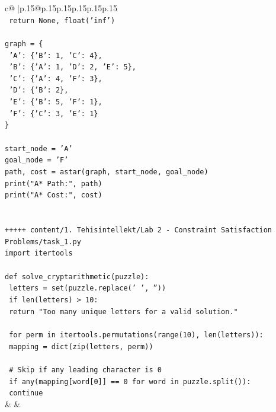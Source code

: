 \documentclass{article}
\begin{document}
{\begin{supertabular}{c@{$\;$}|p{.15\linewidth}@{}p{.15\linewidth}p{.15\linewidth}p{.15\linewidth}p{.15\linewidth}p{.15\linewidth}}
{{{\\ 
\texttt{    return None, float('inf')} \\
\\ 
\texttt{graph = \{} \\
\texttt{    'A': \{'B': 1, 'C': 4\},} \\
\texttt{    'B': \{'A': 1, 'D': 2, 'E': 5\},} \\
\texttt{    'C': \{'A': 4, 'F': 3\},} \\
\texttt{    'D': \{'B': 2\},} \\
\texttt{    'E': \{'B': 5, 'F': 1\},} \\
\texttt{    'F': \{'C': 3, 'E': 1\}} \\
\texttt{\}} \\
\\ 
\texttt{start\_node = 'A'} \\
\texttt{goal\_node = 'F'} \\
\texttt{path, cost = astar(graph, start\_node, goal\_node)} \\
\texttt{print("A* Path:", path)} \\
\texttt{print("A* Cost:", cost)} \\
\\ 
\\ 
\texttt{+++++ content/1. Tehisintellekt/Lab 2 {-} Constraint Satisfaction Problems/task\_1.py} \\
\texttt{import itertools} \\
\\ 
\texttt{def solve\_cryptarithmetic(puzzle):} \\
\texttt{    letters = set(puzzle.replace(' ', ''))} \\
\texttt{    if len(letters) > 10:} \\
\texttt{        return "Too many unique letters for a valid solution."} \\
\\ 
\texttt{    for perm in itertools.permutations(range(10), len(letters)):} \\
\texttt{        mapping = dict(zip(letters, perm))} \\
\\ 
\texttt{        \# Skip if any leading character is 0} \\
\texttt{        if any(mapping{[}word{[}0{]}{]} == 0 for word in puzzle.split()):} \\
\texttt{            continue} \\
            }
        }
    }
    & & \\ \\


\end{supertabular}}
\end{document}
